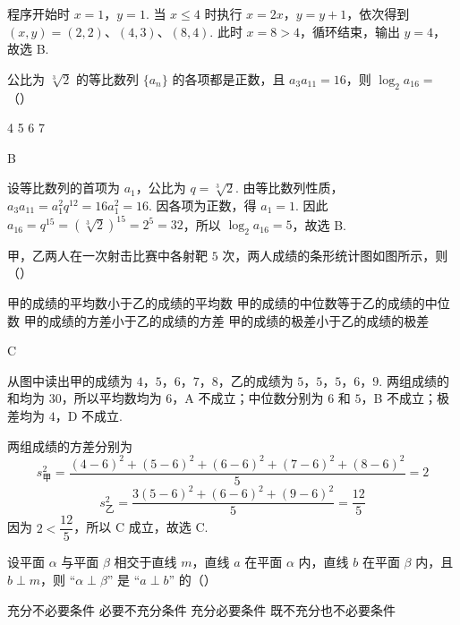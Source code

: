 \begin{solution}
程序开始时 \(x=1\)，\(y=1\). 当 \(x\leqslant4\) 时执行 \(x=2x\)，\(y=y+1\)，依次得到 \((x,y)=(2,2)\)、\((4,3)\)、\((8,4)\). 此时 \(x=8>4\)，循环结束，输出 \(y=4\)，故选 B.
\end{solution}

\begin{problem}
公比为 \(\sqrt[3]{2}\) 的等比数列 \(\{a_{n}\}\) 的各项都是正数，且 \(a_{3}a_{11} = 16\)，则 \(\log_2a_{16} =\)（\quad）

\choices
    {4}
    {5}
    {6}
    {7}
\end{problem}

\begin{answer}
B
\end{answer}

\begin{solution}
设等比数列的首项为 \(a_1\)，公比为 \(q=\sqrt[3]{2}\). 由等比数列性质，
\(a_3a_{11}=a_1^2q^{12}=16a_1^2=16\). 因各项为正数，得 \(a_1=1\). 因此 \(a_{16}=q^{15}=\left(\sqrt[3]{2}\right)^{15}=2^5=32\)，所以 \(\log_2a_{16}=5\)，故选 B.
\end{solution}

\begin{problem}
甲，乙两人在一次射击比赛中各射靶 \(5\) 次，两人成绩的条形统计图如图所示，则（\quad）


\choices
    {甲的成绩的平均数小于乙的成绩的平均数}
    {甲的成绩的中位数等于乙的成绩的中位数}
    {甲的成绩的方差小于乙的成绩的方差}
    {甲的成绩的极差小于乙的成绩的极差}
\end{problem}

\begin{answer}
C
\end{answer}

\begin{solution}
从图中读出甲的成绩为 \(4\)，\(5\)，\(6\)，\(7\)，\(8\)，乙的成绩为 \(5\)，\(5\)，\(5\)，\(6\)，\(9\). 两组成绩的和均为 \(30\)，所以平均数均为 \(6\)，A 不成立；中位数分别为 \(6\) 和 \(5\)，B 不成立；极差均为 \(4\)，D 不成立.

两组成绩的方差分别为
\[
s_{\text{甲}}^2=\frac{(4-6)^2+(5-6)^2+(6-6)^2+(7-6)^2+(8-6)^2}{5}=2
\]
\[
s_{\text{乙}}^2=\frac{3(5-6)^2+(6-6)^2+(9-6)^2}{5}=\frac{12}{5}
\]
因为 \(2<\dfrac{12}{5}\)，所以 C 成立，故选 C.
\end{solution}

\begin{problem}
设平面 \(\alpha\) 与平面 \(\beta\) 相交于直线 \(m\)，直线 \(a\) 在平面 \(\alpha\) 内，直线 \(b\) 在平面 \(\beta\) 内，且 \(b \perp m\)，则 “\(\alpha \perp \beta\)” 是 “\(a \perp b\)” 的（\quad）

\choices
    {充分不必要条件}
    {必要不充分条件}
    {充分必要条件}
    {既不充分也不必要条件}
\end{problem}

